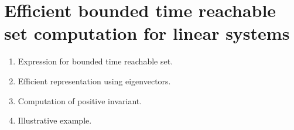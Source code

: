 \section{Efficient bounded time reachable set computation for linear systems}

{\color{red}
\begin{enumerate}
\item Expression for bounded time reachable set.
\item Efficient representation using eigenvectors.
\item Computation of positive invariant.
\item Illustrative example.
\end{enumerate}
}

